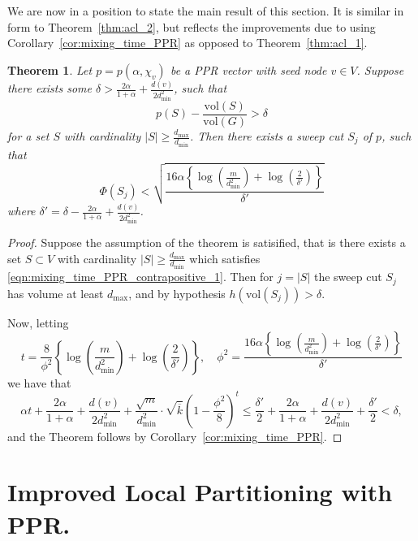 \documentclass{article}
\newcommand{\abs}[1]{\left \lvert #1 \right \rvert}
\newcommand{\vol}{\mathrm{vol}}
\newcommand{\set}[1]{\left\{#1\right\}}
\newcommand{\1}{\mathbf{1}}
\theoremstyle{alden}
\theoremstyle{aldenthm}
\newtheorem{theorem}{Theorem}
\theoremstyle{remark}
\begin{document}
We are now in a position to state the main result of this section. It is similar in form to Theorem~\ref{thm:acl_2}, but reflects the improvements due to using Corollary~\ref{cor:mixing_time_PPR} as opposed to Theorem~\ref{thm:acl_1}.
\begin{theorem}
	\label{thm:mixing_time_PPR_contrapositive}
	Let $p = p(\alpha,\chi_v)$ be a PPR vector with seed node $v \in V$. Suppose there exists some $\delta > \frac{2\alpha}{1 + \alpha} + \frac{d(v)}{2d_{\min}^2}$, such that
	\begin{equation}
	\label{eqn:mixing_time_PPR_contrapositive_1}
	p(S) - \frac{\vol(S)}{\vol(G)} > \delta
	\end{equation}
	for a set $S$ with cardinality $\abs{S} \geq \frac{d_{\max}}{d_{\min}}$. Then there exists a sweep cut $S_j$ of $p$, such that
	\begin{equation*}
	\Phi(S_j) < \sqrt{\frac{16\alpha\left\{\log\left(\frac{m}{d_{\min}^2}\right) + \log\left(\frac{2}{\delta'}\right)\right\}}{\delta'}}
	\end{equation*}
	where $\delta' = \delta - \frac{2\alpha}{1 + \alpha} + \frac{d(v)}{2d_{\min}^2}$. 
\end{theorem}
\begin{proof}
	Suppose the assumption of the theorem is satisified, that is there exists a set $S \subset V$ with cardinality $\abs{S} \geq \frac{d_{\max}}{d_{\min}}$ which satisfies \eqref{eqn:mixing_time_PPR_contrapositive_1}. Then for $j = \abs{S}$ the sweep cut $S_j$ has volume at least $d_{\max}$, and by hypothesis $h(\vol(S_j)) >  \delta$.
	
	Now, letting
	\begin{equation*}
	t = \frac{8}{\phi^2}\left\{\log\left(\frac{m}{d_{\min}^2}\right) + \log\left(\frac{2}{\delta'}\right)\right\}, \quad \phi^2 = \frac{16\alpha\set{\log\left(\frac{m}{d_{\min}^2}\right) + \log(\frac{2}{\delta'})}}{\delta'}
	\end{equation*}
	we have that
	\begin{equation*}
	\alpha t + \frac{2\alpha}{1 + \alpha} + \frac{d(v)}{2d_{\min}^2} + \frac{\sqrt{m}}{d_{\min}^2} \cdot \sqrt{\overline{k}} \left(1 - \frac{\phi^2}{8}\right)^{t} \leq \frac{\delta'}{2} + \frac{2\alpha}{1 + \alpha} + \frac{d(v)}{2d_{\min}^2} + \frac{\delta'}{2} < \delta,
	\end{equation*}
	and the Theorem follows by Corollary~\ref{cor:mixing_time_PPR}.
\end{proof}

\section{Improved Local Partitioning with PPR.}
\end{document}

